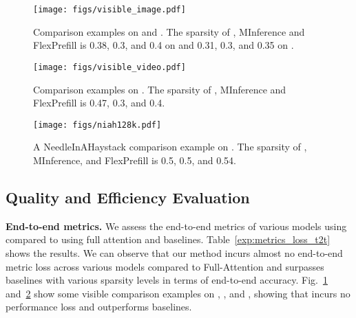 \begin{figure}[!h]
    \centering
    \vspace{-.5em}
    \texttt{[image: figs/visible\_image.pdf]}
    \vspace{-1.75em}
    \caption{Comparison examples on \flux and \sd. The sparsity of \our, MInference and FlexPrefill is 0.38, 0.3, and 0.4 on \flux and 0.31, 0.3, and 0.35 on \sd.}
    \vspace{-1em}
    \label{fig:visible_image}
\end{figure}

\begin{figure}[!h]
    \centering
    \vspace{-.5em}
    \texttt{[image: figs/visible\_video.pdf]}
    \vspace{-2em}
    \caption{Comparison examples on \mochi. The sparsity of \our, MInference and FlexPrefill is 0.47, 0.3, and 0.4.}
    \vspace{-1em}
    \label{fig:visible_video}
\end{figure}

\begin{figure}[!h]
    \centering
    \texttt{[image: figs/niah128k.pdf]}
    \vspace{-1em}
    \caption{A NeedleInAHaystack comparison example on \llamal. The sparsity of \our, MInference, and FlexPrefill is 0.5, 0.5, and 0.54. }
    \vspace{-1em}
    \label{fig:niah_example}
\end{figure}





\subsection{Quality and Efficiency Evaluation}

\textbf{End-to-end metrics.} We assess the end-to-end metrics of various models using \our compared to using full attention and baselines. Table~\ref{exp:metrics_loss_t2t} shows the results. We can observe that our method incurs almost no end-to-end metric loss across various models compared to Full-Attention and surpasses baselines with various sparsity levels in terms of end-to-end accuracy. Fig.~\ref{fig:visible_image} and~\ref{fig:visible_video} show some visible comparison examples on \flux, \sd, and \mochi, showing that \our incurs no performance loss and outperforms baselines.


